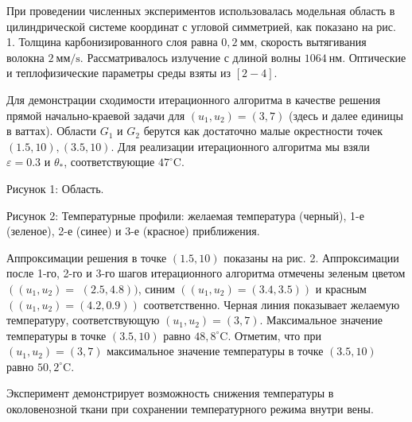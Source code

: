 При проведении численных экспериментов использовалась модельная область в
цилиндрической системе координат с угловой симметрией, как показано на рис. 1.
Толщина карбонизированного слоя равна
$0,2 \mathrm{~мм}$, скорость вытягивания волокна
$2 \mathrm{~мм}/\mathrm{s}$. Рассматривалось излучение с длиной волны
$1064 \mathrm{~нм}$.
Оптические и теплофизические параметры среды взяты из $[2-4]$.


Для демонстрации сходимости итерационного алгоритма в качестве
решения прямой начально-краевой задачи для $\left(u_{1}, u_{2}\right)=( 3,7)$
(здесь и далее единицы в ваттах).
Области $G_{1}$ и $G_{2}$
берутся как достаточно малые окрестности точек $(1.5,10),(3.5,10)$.
Для реализации итерационного алгоритма мы взяли $\varepsilon=0.3$ и $\theta_{*}$,
соответствующие $47^{\circ} \mathrm{C}$.



Рисунок 1: Область.


Рисунок 2: Температурные профили: желаемая температура (черный),
1-е (зеленое), 2-е (синее) и 3-е (красное) приближения.

Аппроксимации решения в точке $(1.5,10)$ показаны на рис. 2.
Аппроксимации после 1-го, 2-го и 3-го шагов итерационного алгоритма отмечены зеленым
цветом
$\left(\left(u_{1 }, u_{2}\right)=\right.$ $(2.5,4.8))$,
синим  $\left(\left(u_{1}, u_{2}\right)=(3.4,3.5)\right)$
и красным $\left(\left(u_{1}, u_{2}\right)=(4.2,0.9)\right)$ соответственно.
Черная линия показывает желаемую температуру, соответствующую
$\left(u_{1}, u_{2}\right)=(3,7)$.
Максимальное значение температуры в точке $(3.5,10)$ равно $48,8^{\circ}\mathrm{C}$.
Отметим, что при $\left(u_{1}, u_{2}\right)=(3,7)$ максимальное значение
температуры в точке $(3.5,10)$ равно $50,2^{ \circ} \mathrm{C}$.

Эксперимент демонстрирует возможность снижения температуры в
околовенозной ткани при сохранении температурного режима внутри вены.
